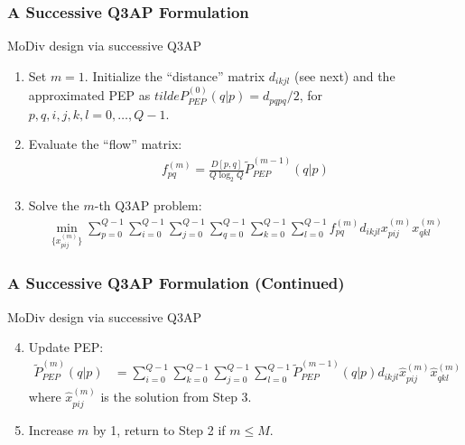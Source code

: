 \documentclass{beamer}
\begin{document}
\begin{frame}
  \frametitle{A Successive Q3AP Formulation}
  \begin{block}{MoDiv design via successive Q3AP}
    \begin{enumerate}[<+->]
      \item Set $m = 1$. Initialize the ``distance'' matrix $d_{ikjl}$ (see
      next) and the approximated PEP as $tilde{P}_{PEP}^{(0)}(q|p) =
        d_{pqpq}/2$, for $p, q, i, j, k, l=0,\ldots,Q-1$.
      \item Evaluate the ``flow'' matrix:
      \begin{align*}
        f_{pq}^{(m)} = \frac{D[p,q]}{Q\log_2Q}\tilde{P}_{PEP}^{(m-1)}(q|p)
      \end{align*}
      \item Solve the $m$-th Q3AP problem:
      \begin{align*}
        \min_{\{x_{pij}^{(m)}\}}
        \sum_{p=0}^{Q-1}\sum_{i=0}^{Q-1}\sum_{j=0}^{Q-1}
        \sum_{q=0}^{Q-1}\sum_{k=0}^{Q-1}\sum_{l=0}^{Q-1}
        f_{pq}^{(m)}d_{ikjl}x_{pij}^{(m)}x_{qkl}^{(m)}
      \end{align*}
    \end{enumerate}
  \end{block}
\end{frame}

\begin{frame}
  \frametitle{A Successive Q3AP Formulation (Continued)}
  \begin{block}{MoDiv design via successive Q3AP}
    \begin{enumerate}[<+->]
      \setcounter{enumi}{3}
      \item Update PEP:
      \begin{align*}
        \tilde{P}_{PEP}^{(m)}(q|p) & = \sum_{i=0}^{Q-1} \sum_{k=0}^{Q-1}
        \sum_{j=0}^{Q-1} \sum_{l=0}^{Q-1}\tilde{P}_{PEP}^{(m
        - 1)}(q|p)d_{ikjl}\hat{x}_{pij}^{(m)}\hat{x}_{qkl}^{(m)}
      \end{align*}
      where $\hat{x}_{pij}^{(m)}$ is the solution from Step 3.
      \item Increase $m$ by 1, return to Step 2 if $m \leq M$.
    \end{enumerate}
  \end{block}
  \vfill
\end{frame}
\end{document}
